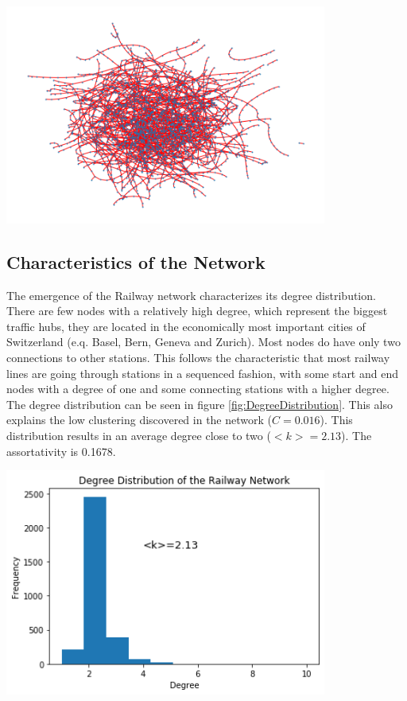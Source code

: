 \documentclass{Resources/netsci-project}
\begin{document}
\begin{center}
    \centering
    \includegraphics[width=300pt]{Resources/Network_cleaned_on_map}
    \label{fig:NetworkCleanedOnMap}
\end{center}


\subsection{Characteristics of the Network}
The emergence of the Railway network characterizes its degree distribution. There are few nodes with a relatively high degree, which represent the biggest traffic hubs, they are located in the economically most important cities of Switzerland (e.q. Basel, Bern, Geneva and Zurich). Most nodes do have only two connections to other stations. This follows the characteristic that most railway lines are going through stations in a sequenced fashion, with some start and end nodes with a degree of one and some connecting stations with a higher degree. The degree distribution can be seen in figure \ref{fig:DegreeDistribution}. This also explains the low clustering discovered in the network ($ C = 0.016 $). This distribution results in an average degree close to two ($ <k> = 2.13 $). The assortativity is 0.1678.

\begin{center}
    \centering
    \includegraphics[width=300pt]{Resources/degree_distribution}
    \label{fig:DegreeDistribution}
\end{center}
\end{document}
